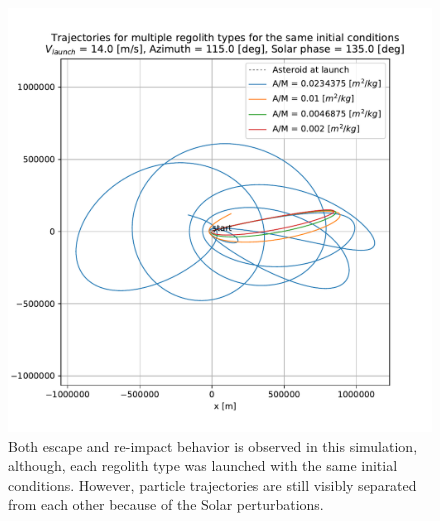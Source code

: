 \FloatBarrier
\begin{figure}[!h]
\centering
\captionsetup{justification=centering}
\includegraphics[width=\textwidth, height=0.4\textheight, keepaspectratio=true]{leading_edge_perturbations/mixedFates_traj_14ms_115Azim_135solarPhase.pdf}
\caption{Both escape and re-impact behavior is observed in this simulation, although, each regolith type was launched with the same initial conditions. However, particle trajectories are still visibly separated from each other because of the Solar perturbations.}
\label{fig:mixed_traj_14ms_115Azim_135solarPhase_leadingEdge}
\end{figure}
\FloatBarrier

